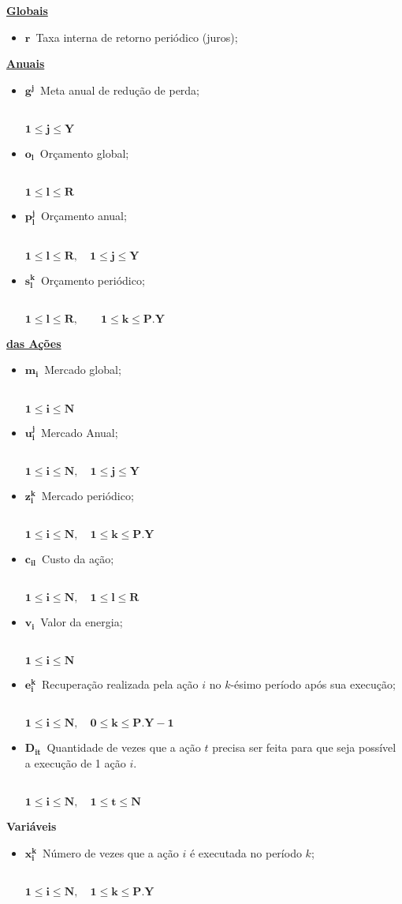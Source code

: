 \documentclass{article}
\newcommand{\topico}[1]{
  \vspace{20pt}
  {\Large \bf #1 }
}
\newcommand{\subtopico}[1]{
  {\large \bf \underline{#1}}
  \\
}
\newcommand{\variavel}[1]{
  { \Large $ \bm{ #1 } \, $}
}
\newcommand{\decorator}[1]{
  {\\ \scriptsize \hspace*{12pt} $ \bm{ #1 } $ }
}
\begin{document}
\begin{multicols}{2}

\subtopico{Globais}
\begin{itemize}
  \item \variavel{r} Taxa interna de retorno periódico (juros);
\end{itemize}

\subtopico{Anuais}
\begin{itemize}
  \item \variavel{g^j} Meta anual de redução de perda;
    \decorator{1 \leq j \leq Y}
  \item \variavel{o_l} Orçamento global;
    \decorator{1 \leq l \leq R}
  \item \variavel{p_l^j} Orçamento anual;
    \decorator{1 \leq l \leq R, \quad 1 \leq j \leq Y}
  \item \variavel{s_l^{k}} Orçamento periódico;
    \decorator{1 \leq l \leq R, \quad \quad 1 \leq k \leq P.Y}
\end{itemize}

\vfill \columnbreak

\subtopico{das Ações}
\begin{itemize}
  \item \variavel{m_i} Mercado global;
    \decorator{1 \leq i \leq N}
  \item \variavel{u_i^j} Mercado Anual;
    \decorator{1 \leq i \leq N, \quad 1 \leq j \leq Y}
  \item \variavel{z_i^k} Mercado periódico;
    \decorator{1 \leq i \leq N, \quad 1 \leq k \leq P.Y}
  \item \variavel{c_{il}} Custo da ação;
    \decorator{1 \leq i \leq N, \quad 1 \leq l \leq R}
  \item \variavel{v_i} Valor da energia;
    \decorator{1 \leq i \leq N}
  \item \variavel{e_i^k} Recuperação realizada pela ação $i$ no $k$-ésimo período
    após sua execução;
    \decorator{1 \leq i \leq N, \quad 0 \leq k \leq P.Y-1}
  \item \variavel{D_{it}} Quantidade de vezes que a ação $t$ precisa ser
  	feita para que seja possível a execução de 1 ação $i$.
    \decorator{1 \leq i \leq N, \quad 1 \leq t \leq N}
\end{itemize}

\end{multicols}

\pagebreak

\topico{Variáveis}
\begin{itemize}
  \item \variavel{x_i^k} Número de vezes que a ação $i$ é executada no período $k$;
    \decorator{1 \leq i \leq N, \quad 1 \leq k \leq P.Y}
\end{itemize}
\end{document}
